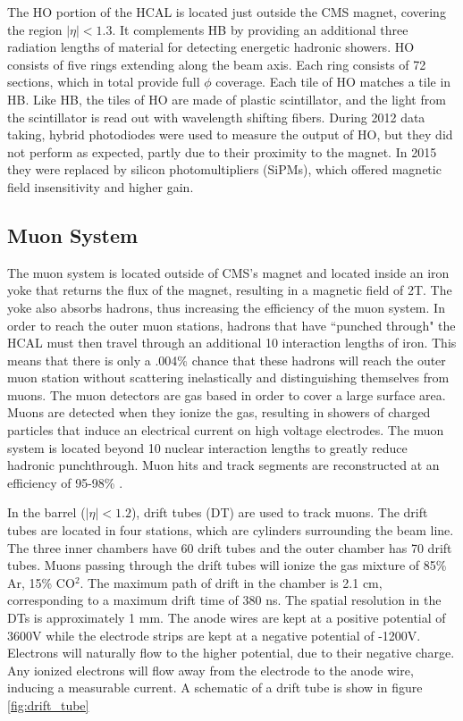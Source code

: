 \documentclass[oneside, letterpaper, oldfontcommands]{memoir}
\begin{document}
\qquad The HO portion of the HCAL is located just outside the CMS magnet, covering the region $|\eta| < 1.3$.  It complements HB by providing an additional three radiation lengths of material for detecting energetic hadronic showers. HO consists of five rings extending along the beam axis. Each ring consists of 72 sections, which in total provide full $\phi$ coverage. Each tile of HO matches a tile in HB. Like HB, the tiles of HO are made of plastic scintillator, and the light from the scintillator is read out with wavelength shifting fibers. During 2012 data taking, hybrid photodiodes were used to measure the output of HO, but they did not perform as expected, partly due to their proximity to the magnet. In 2015 they were replaced by silicon photomultipliers (SiPMs), which offered magnetic field insensitivity and higher gain\cite{Lobanov:2015jla}. 



\subsection{Muon System}\label{muonsys}
\qquad The muon system is located outside of CMS's magnet and located inside an iron yoke that returns the flux of the magnet, resulting in a magnetic field of 2T. The yoke also absorbs hadrons, thus increasing the efficiency of the muon system. In order to reach the outer muon stations, hadrons that have ``punched through" the HCAL must then travel through an additional 10 interaction lengths of iron. This means that there is only a .004\% chance that these hadrons will reach the outer muon station without scattering inelastically and distinguishing themselves from muons. The muon detectors are gas based in order to cover a large surface area. Muons are detected when they ionize the gas, resulting in showers of charged particles that induce an electrical current on high voltage electrodes. The muon system is located beyond 10 nuclear interaction lengths to greatly reduce hadronic punchthrough. Muon hits and track segments are reconstructed at an efficiency of 95-98\% \cite{Chatrchyan:2013sba}.

\qquad In the barrel ($|\eta| < 1.2$), drift tubes (DT) are used to track muons. The drift tubes are located in four stations, which are cylinders surrounding the beam line. The three inner chambers have 60 drift tubes and the outer chamber has 70 drift tubes. Muons passing through the drift tubes will ionize the gas mixture of 85\% Ar, 15\% CO$^{2}$. The maximum path of drift in the chamber is 2.1 cm, corresponding to a maximum drift time of 380 ns. The spatial resolution in the DTs is approximately 1 mm\cite{Chatrchyan:2013sba}. The anode wires are kept at a positive potential of 3600V while the electrode strips are kept at a negative potential of -1200V. Electrons will naturally flow to the higher potential, due to their negative charge. Any ionized electrons will flow away from the electrode to the anode wire, inducing a measurable current. A schematic of a drift tube is show in figure \ref{fig:drift_tube}
\end{document}

